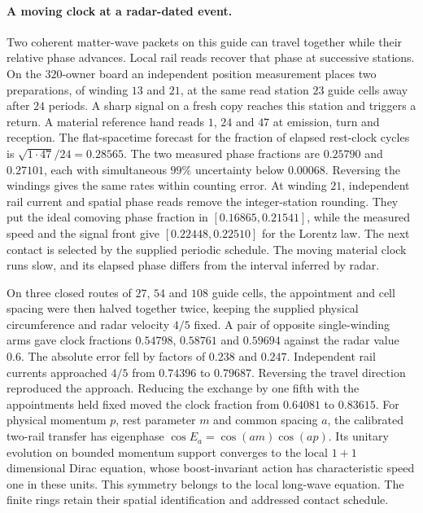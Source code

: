 \documentclass[11pt]{article}
\theoremstyle{definition}
\theoremstyle{remark}
\theoremstyle{plain}
\begin{document}
\paragraph{A moving clock at a radar-dated event.}
Two coherent matter-wave packets on this guide can travel together
while their relative phase advances. Local rail reads recover that
phase at successive stations. On the $320$-owner board an independent
position measurement places two preparations, of winding $13$ and $21$,
at the same read station $23$ guide cells away after $24$ periods. A
sharp signal on a fresh copy reaches this station and triggers a return.
A material reference hand reads $1$, $24$ and $47$ at emission, turn and
reception. The flat-spacetime forecast for the fraction of elapsed
rest-clock cycles is $\sqrt{1\cdot47}/24=0.28565$. The two measured
phase fractions are $0.25790$ and $0.27101$, each with simultaneous
$99\%$ uncertainty below $0.00068$. Reversing the windings gives the
same rates within counting error. At winding $21$, independent rail
current and spatial phase reads remove the integer-station rounding.
They put the ideal comoving phase fraction in $[0.16865,0.21541]$,
while the measured speed and the signal front give $[0.22448,0.22510]$
for the Lorentz law. The next contact is selected by the supplied
periodic schedule. The moving material clock runs slow, and its
elapsed phase differs from the interval inferred by radar.

On three closed routes of $27$, $54$ and $108$ guide cells, the
appointment and cell spacing were then halved together twice, keeping
the supplied physical circumference and radar velocity $4/5$ fixed.
A pair of opposite single-winding arms gave clock fractions
$0.54798$, $0.58761$ and $0.59694$ against the radar value $0.6$.
The absolute error fell by factors of $0.238$ and $0.247$.
Independent rail currents approached $4/5$ from $0.74396$ to $0.79687$.
Reversing the travel direction reproduced the approach. Reducing the
exchange by one fifth with the appointments held fixed moved the clock
fraction from $0.64081$ to $0.83615$. For physical momentum $p$,
rest parameter $m$ and common spacing $a$, the calibrated two-rail
transfer has eigenphase $\cos E_a=\cos(am)\cos(ap)$. Its unitary
evolution on bounded momentum support converges to the local
$1+1$ dimensional Dirac equation, whose boost-invariant action has
characteristic speed one in these units. This symmetry belongs to
the local long-wave equation. The finite rings retain their spatial
identification and addressed contact schedule.
\end{document}
